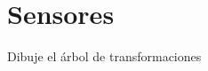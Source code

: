 \documentclass[parcial]{lcc}
\begin{document}
\maketitle

\section{Sensores}
\ejercicio Dibuje el árbol de transformaciones


\ejercicio 
\end{document}
